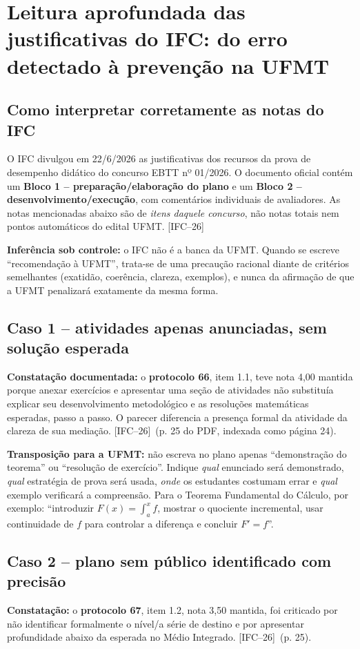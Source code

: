 \documentclass[11pt,a4paper]{article}
\newcommand{\fifc}{\textsf{[IFC--26]}}
\begin{document}
\section{Leitura aprofundada das justificativas do IFC: do erro detectado à prevenção na UFMT}
\subsection{Como interpretar corretamente as notas do IFC}
O IFC divulgou em 22/6/2026 as justificativas dos recursos da prova de desempenho didático do concurso EBTT nº 01/2026. O documento oficial contém um \textbf{Bloco 1 -- preparação/elaboração do plano} e um \textbf{Bloco 2 -- desenvolvimento/execução}, com comentários individuais de avaliadores. As notas mencionadas abaixo são de \emph{itens daquele concurso}, não notas totais nem pontos automáticos do edital UFMT. \fifc

\begin{cuidado}
\textbf{Inferência sob controle:} o IFC não é a banca da UFMT. Quando se escreve ``recomendação à UFMT'', trata-se de uma precaução racional diante de critérios semelhantes (exatidão, coerência, clareza, exemplos), e nunca da afirmação de que a UFMT penalizará exatamente da mesma forma.
\end{cuidado}

\subsection{Caso 1 -- atividades apenas anunciadas, sem solução esperada}
\textbf{Constatação documentada:} o \textbf{protocolo 66}, item 1.1, teve nota 4,00 mantida porque anexar exercícios e apresentar uma seção de atividades não substituía explicar seu desenvolvimento metodológico e as resoluções matemáticas esperadas, passo a passo. O parecer diferencia a presença formal da atividade da clareza de sua mediação. \fifc\ (p. 25 do PDF, indexada como página 24).

\textbf{Transposição para a UFMT:} não escreva no plano apenas ``demonstração do teorema'' ou ``resolução de exercício''. Indique \emph{qual} enunciado será demonstrado, \emph{qual} estratégia de prova será usada, \emph{onde} os estudantes costumam errar e \emph{qual} exemplo verificará a compreensão. Para o Teorema Fundamental do Cálculo, por exemplo: ``introduzir $F(x)=\int_a^x f$, mostrar o quociente incremental, usar continuidade de $f$ para controlar a diferença e concluir $F'=f$''.

\subsection{Caso 2 -- plano sem público identificado com precisão}
\textbf{Constatação:} o \textbf{protocolo 67}, item 1.2, nota 3,50 mantida, foi criticado por não identificar formalmente o nível/a série de destino e por apresentar profundidade abaixo da esperada no Médio Integrado. \fifc\ (p. 25).
\end{document}

